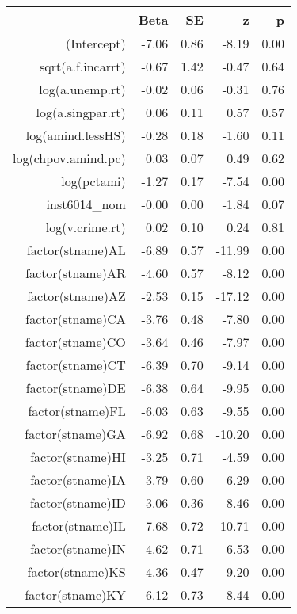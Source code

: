 \begin{table}[ht]
\centering
\begin{tabular}{rrrrr}
  \hline
 & Beta & SE & z & p \\ 
  \hline
(Intercept) & -7.06 & 0.86 & -8.19 & 0.00 \\ 
  sqrt(a.f.incarrt) & -0.67 & 1.42 & -0.47 & 0.64 \\ 
  log(a.unemp.rt) & -0.02 & 0.06 & -0.31 & 0.76 \\ 
  log(a.singpar.rt) & 0.06 & 0.11 & 0.57 & 0.57 \\ 
  log(amind.lessHS) & -0.28 & 0.18 & -1.60 & 0.11 \\ 
  log(chpov.amind.pc) & 0.03 & 0.07 & 0.49 & 0.62 \\ 
  log(pctami) & -1.27 & 0.17 & -7.54 & 0.00 \\ 
  inst6014\_nom & -0.00 & 0.00 & -1.84 & 0.07 \\ 
  log(v.crime.rt) & 0.02 & 0.10 & 0.24 & 0.81 \\ 
  factor(stname)AL & -6.89 & 0.57 & -11.99 & 0.00 \\ 
  factor(stname)AR & -4.60 & 0.57 & -8.12 & 0.00 \\ 
  factor(stname)AZ & -2.53 & 0.15 & -17.12 & 0.00 \\ 
  factor(stname)CA & -3.76 & 0.48 & -7.80 & 0.00 \\ 
  factor(stname)CO & -3.64 & 0.46 & -7.97 & 0.00 \\ 
  factor(stname)CT & -6.39 & 0.70 & -9.14 & 0.00 \\ 
  factor(stname)DE & -6.38 & 0.64 & -9.95 & 0.00 \\ 
  factor(stname)FL & -6.03 & 0.63 & -9.55 & 0.00 \\ 
  factor(stname)GA & -6.92 & 0.68 & -10.20 & 0.00 \\ 
  factor(stname)HI & -3.25 & 0.71 & -4.59 & 0.00 \\ 
  factor(stname)IA & -3.79 & 0.60 & -6.29 & 0.00 \\ 
  factor(stname)ID & -3.06 & 0.36 & -8.46 & 0.00 \\ 
  factor(stname)IL & -7.68 & 0.72 & -10.71 & 0.00 \\ 
  factor(stname)IN & -4.62 & 0.71 & -6.53 & 0.00 \\ 
  factor(stname)KS & -4.36 & 0.47 & -9.20 & 0.00 \\ 
  factor(stname)KY & -6.12 & 0.73 & -8.44 & 0.00 \\ 

\end{tabular}
\end{table}
